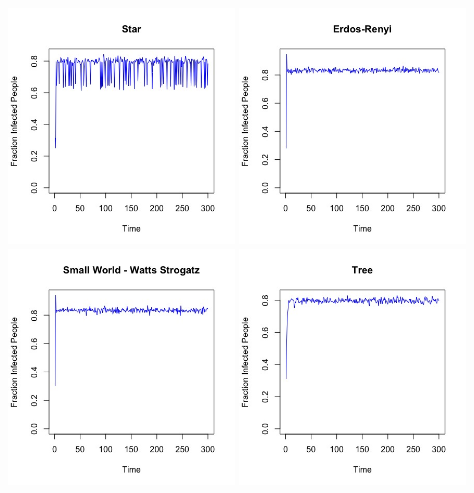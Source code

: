 \documentclass{article}
\begin{document}
\begin{center}
   
    
    \includegraphics[width=6cm]{star_4.jpeg}
    \includegraphics[width=6cm]{erdos_renyi_4.jpeg}
    \includegraphics[width=6cm]{watts_strogatz_4.jpeg}
    \includegraphics[width=6cm]{tree_4.jpeg}

\end{center}
\end{document}
